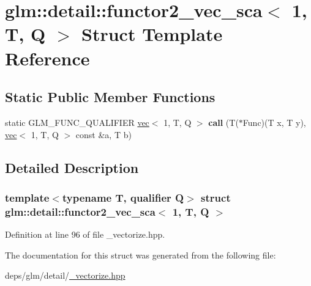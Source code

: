 \hypertarget{structglm_1_1detail_1_1functor2__vec__sca_3_011_00_01T_00_01Q_01_4}{}\section{glm\+:\+:detail\+:\+:functor2\+\_\+vec\+\_\+sca$<$ 1, T, Q $>$ Struct Template Reference}
\label{structglm_1_1detail_1_1functor2__vec__sca_3_011_00_01T_00_01Q_01_4}
\subsection*{Static Public Member Functions}
\begin{DoxyCompactItemize}
\item 
\mbox{\label{structglm_1_1detail_1_1functor2__vec__sca_3_011_00_01T_00_01Q_01_4_a89645239c9fe91ac369acd3bc5cd544f}} 
static G\+L\+M\+\_\+\+F\+U\+N\+C\+\_\+\+Q\+U\+A\+L\+I\+F\+I\+ER \hyperlink{structglm_1_1vec}{vec}$<$ 1, T, Q $>$ {\bfseries call} (T($\ast$Func)(T x, T y), \hyperlink{structglm_1_1vec}{vec}$<$ 1, T, Q $>$ const \&a, T b)
\end{DoxyCompactItemize}


\subsection{Detailed Description}
\subsubsection*{template$<$typename T, qualifier Q$>$\newline
struct glm\+::detail\+::functor2\+\_\+vec\+\_\+sca$<$ 1, T, Q $>$}



Definition at line 96 of file \+\_\+vectorize.\+hpp.



The documentation for this struct was generated from the following file\+:\begin{DoxyCompactItemize}
\item 
deps/glm/detail/\hyperlink{__vectorize_8hpp}{\+\_\+vectorize.\+hpp}\end{DoxyCompactItemize}
